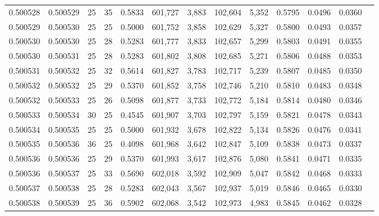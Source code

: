 \begin{tabular}{rrrrrrrrrrrrr}
0.500528 & 0.500529 &    25 &  35 &                                     0.5833 & 601,727 &   3,883 & 102,604 &   5,352 & 0.5795 & 0.0496 & 0.0360 \\
0.500529 & 0.500530 &    25 &  25 &                                     0.5000 & 601,752 &   3,858 & 102,629 &   5,327 & 0.5800 & 0.0493 & 0.0357 \\
0.500530 & 0.500530 &    25 &  28 &                                     0.5283 & 601,777 &   3,833 & 102,657 &   5,299 & 0.5803 & 0.0491 & 0.0355 \\
0.500530 & 0.500531 &    25 &  28 &                                     0.5283 & 601,802 &   3,808 & 102,685 &   5,271 & 0.5806 & 0.0488 & 0.0353 \\
0.500531 & 0.500532 &    25 &  32 &                                     0.5614 & 601,827 &   3,783 & 102,717 &   5,239 & 0.5807 & 0.0485 & 0.0350 \\
0.500532 & 0.500532 &    25 &  29 &                                     0.5370 & 601,852 &   3,758 & 102,746 &   5,210 & 0.5810 & 0.0483 & 0.0348 \\
0.500532 & 0.500533 &    25 &  26 &                                     0.5098 & 601,877 &   3,733 & 102,772 &   5,184 & 0.5814 & 0.0480 & 0.0346 \\
0.500533 & 0.500534 &    30 &  25 &                                     0.4545 & 601,907 &   3,703 & 102,797 &   5,159 & 0.5821 & 0.0478 & 0.0343 \\
0.500534 & 0.500535 &    25 &  25 &                                     0.5000 & 601,932 &   3,678 & 102,822 &   5,134 & 0.5826 & 0.0476 & 0.0341 \\
0.500535 & 0.500536 &    36 &  25 &                                     0.4098 & 601,968 &   3,642 & 102,847 &   5,109 & 0.5838 & 0.0473 & 0.0337 \\
0.500536 & 0.500536 &    25 &  29 &                                     0.5370 & 601,993 &   3,617 & 102,876 &   5,080 & 0.5841 & 0.0471 & 0.0335 \\
0.500536 & 0.500537 &    25 &  33 &                                     0.5690 & 602,018 &   3,592 & 102,909 &   5,047 & 0.5842 & 0.0468 & 0.0333 \\
0.500537 & 0.500538 &    25 &  28 &                                     0.5283 & 602,043 &   3,567 & 102,937 &   5,019 & 0.5846 & 0.0465 & 0.0330 \\
0.500538 & 0.500539 &    25 &  36 &                                     0.5902 & 602,068 &   3,542 & 102,973 &   4,983 & 0.5845 & 0.0462 & 0.0328 \\

\end{tabular}
